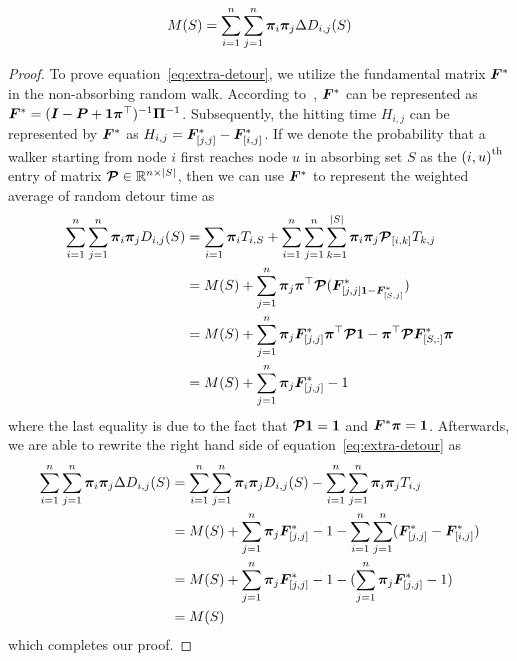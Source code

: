 \documentclass[sigconf]{acmart}
\begin{document}
\begin{theorem}\label{thm:extra_detour}
    \begin{equation}\label{eq:extra-detour}
        M(S)=\sum_{i=1}^n\sum_{j=1}^n\boldsymbol{\pi}_i\boldsymbol{\pi}_j\Delta D_{i,j}(S)
    \end{equation}
\end{theorem}
\begin{proof}
    To prove equation~\eqref{eq:extra-detour}, we utilize the fundamental matrix \(\boldsymbol{F}^*\) in the non-absorbing random walk.
    According to~\cite{BoRaZh11}, \(\boldsymbol{F}^*\) can be represented as \(\boldsymbol{F}^*=(\boldsymbol{I}-\boldsymbol{P}+\boldsymbol{1}\boldsymbol{\pi}^\top)^{-1}\boldsymbol{\Pi}^{-1}\).
    Subsequently, the hitting time \(H_{i,j}\) can be represented by \(\boldsymbol{F}^*\) as \(H_{i,j}=\boldsymbol{F}^*_{[j,j]}-\boldsymbol{F}^*_{[i,j]}\).
    If we denote the probability that a walker starting from node \(i\) first reaches node \(u\) in absorbing set \(S\) as the \({(i,u)}^{\rm{th}}\) entry of matrix \(\boldsymbol{\mathcal{P}}\in\mathbb{R}^{n\times\left|S \right|}\), then we can use \(\boldsymbol{F}^*\) to represent the weighted average of random detour time as
    \begin{align*}
        \sum_{i=1}^n\sum_{j=1}^n\boldsymbol{\pi}_i\boldsymbol{\pi}_jD_{i,j}(S)
         & =\sum_{i=1}\boldsymbol{\pi}_i T_{i,S}+\sum_{i=1}^n\sum_{j=1}^n\sum_{k=1}^{\left|S \right|}\boldsymbol{\pi}_i\boldsymbol{\pi}_j\boldsymbol{\mathcal{P}}_{[i,k]}T_{k,j}  \\
         & =M(S)+\sum_{j=1}^n\boldsymbol{\pi}_j\boldsymbol{\pi}^\top\boldsymbol{\mathcal{P}}(\boldsymbol{F}^*_{[j,j]\boldsymbol{1}-\boldsymbol{F}^*_{[S,j]}})                        \\
         & =M(S)+\sum_{j=1}^n\boldsymbol{\pi}_j\boldsymbol{F}^*_{[j,j]}\boldsymbol{\pi}^\top\boldsymbol{\mathcal{P}}\boldsymbol{1}-\boldsymbol{\pi}^\top\boldsymbol{\mathcal{P}}\boldsymbol{F}^*_{[S,:]}\boldsymbol{\pi} \\
         & =M(S)+\sum_{j=1}^n\boldsymbol{\pi}_j\boldsymbol{F}^*_{[j,j]}-1
    \end{align*}
    where the last equality is due to the fact that \(\boldsymbol{\mathcal{P}}\boldsymbol{1}=\boldsymbol{1}\) and \(\boldsymbol{F}^*\boldsymbol{\pi}=\boldsymbol{1}\).
    Afterwards, we are able to rewrite the right hand side of equation~\eqref{eq:extra-detour} as
    \begin{align*}
        \sum_{i=1}^n\sum_{j=1}^n\boldsymbol{\pi}_i\boldsymbol{\pi}_j\Delta D_{i,j}(S)
         & =\sum_{i=1}^n\sum_{j=1}^n\boldsymbol{\pi}_i\boldsymbol{\pi}_jD_{i,j}(S)-\sum_{i=1}^n\sum_{j=1}^n\boldsymbol{\pi}_i\boldsymbol{\pi}_jT_{i,j}         \\
         & =M(S)+\sum_{j=1}^n\boldsymbol{\pi}_j\boldsymbol{F}^*_{[j,j]}-1-\sum_{i=1}^n\sum_{j=1}^n(\boldsymbol{F}^*_{[j,j]}-\boldsymbol{F}^*_{[i,j]}) \\
         & =M(S)+\sum_{j=1}^n\boldsymbol{\pi}_j\boldsymbol{F}^*_{[j,j]}-1-(\sum_{j=1}^n\boldsymbol{\pi}_j\boldsymbol{F}^*_{[j,j]}-1)                     \\
         & =M(S)
    \end{align*}
    which completes our proof.
\end{proof}
\end{document}
